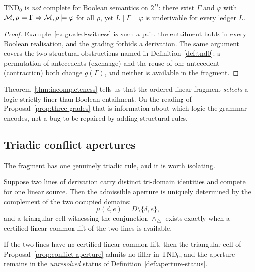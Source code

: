 \begin{theorem}[Incompleteness]\label{thm:incompleteness}
$\mathrm{TND}_0$ is \emph{not} complete for Boolean semantics on $2^{D}$: there exist
$\Gamma$ and $\varphi$ with $\mathcal M,\rho\models\Gamma\Rightarrow\mathcal M,\rho\models\varphi$ for
all $\rho$, yet $L\mid\Gamma\vdash\varphi$ is underivable for every ledger $L$.
\end{theorem}

\begin{proof}
Example~\ref{ex:graded-witness} is such a pair: the entailment holds in every Boolean
realisation, and the grading forbids a derivation.  The same argument covers the two
structural obstructions named in Definition~\ref{def:tnd0}: a permutation of antecedents
(exchange) and the reuse of one antecedent (contraction) both change $g(\Gamma)$, and
neither is available in the fragment.
\end{proof}

\begin{remark}
Theorem~\ref{thm:incompleteness} tells us that the ordered linear fragment \emph{selects}
a logic strictly finer than Boolean entailment.  On the reading of
Proposal~\ref{prop:three-grades} that is information about which logic the grammar
encodes, not a bug to be repaired by adding structural rules.
\end{remark}

\subsection{Triadic conflict apertures}

The fragment has one genuinely triadic rule, and it is worth isolating.

\begin{proposal}\label{prop:conflict-aperture}
Suppose two lines of derivation carry distinct tri-domain identities and compete for one
linear source.  Then the admissible aperture is uniquely determined by the complement of
the two occupied domains:
\[
  \mu(d,e)=D\setminus\{d,e\},
\]
and a triangular cell witnessing the conjunction $\wedge_{\triangle}$ exists exactly when a
certified linear common lift of the two lines is available.
\end{proposal}

\begin{proposition}
\label{prop:common-lift}
If the two lines have no certified linear common lift, then the triangular cell of
Proposal~\ref{prop:conflict-aperture} admits no filler in $\mathrm{TND}_0$, and the
aperture remains in the \emph{unresolved} status of
Definition~\ref{def:aperture-status}.
\end{proposition}

